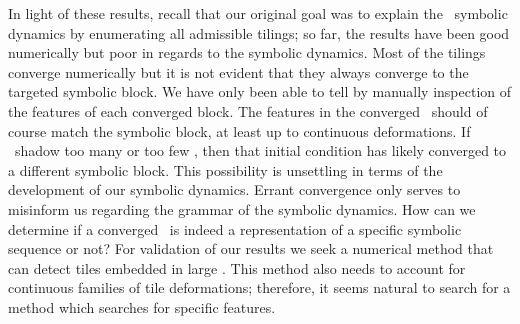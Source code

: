 In light of these results,
recall that our original goal was to explain the \spt\ symbolic dynamics
by enumerating all admissible tilings; so far, the results
have been good numerically but poor in regards to the symbolic dynamics.
Most of the tilings converge numerically but it is not
evident that they always converge to the targeted
symbolic block. We have only been
able to tell by manually inspection of the features
of each converged block. The features in the converged \twot\
should of course match the symbolic block, at least up to continuous
deformations.
If \twots\ shadow too many or too few \twots, then that
initial condition has likely converged to
a different symbolic block.
This possibility is unsettling in terms of the development of our
symbolic dynamics. Errant convergence only serves to misinform us
regarding the grammar of the symbolic dynamics.
How can we determine if a converged \twot\
is indeed a representation of a specific symbolic sequence or not?
For validation of our results we seek a numerical method that
can detect tiles embedded in large \twots.
This method also needs to account for continuous families of tile deformations;
therefore, it seems natural to search for a method which searches for
specific features.

